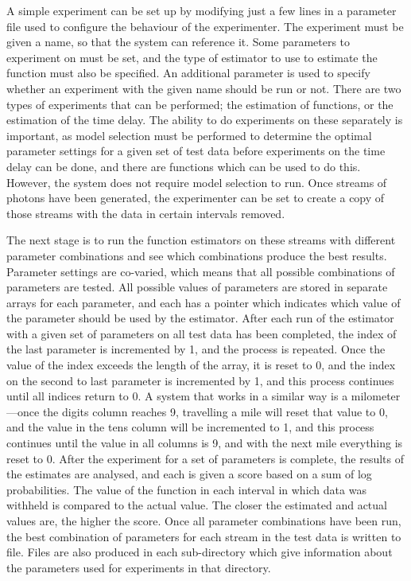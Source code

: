 \documentclass[a4paper,11pt]{article}
\begin{document}
   A simple experiment can be set up by modifying just a few lines in a
   parameter file used to configure the behaviour of the experimenter. The
   experiment must be given a name, so that the system can reference it. Some
   parameters to experiment on must be set, and the type of estimator to use to
   estimate the function must also be specified. An additional parameter is used
   to specify whether an experiment with the given name should be run or
   not. There are two types of experiments that can be performed; the estimation
   of functions, or the estimation of the time delay. The ability to do
   experiments on these separately is important, as model selection must be
   performed to determine the optimal parameter settings for a given set of test
   data before experiments on the time delay can be done, and there are
   functions which can be used to do this. However, the system does not require
   model selection to run. Once streams of photons have been generated, the
   experimenter can be set to create a copy of those streams with the data in
   certain intervals removed. 
   
   The next stage is to run the function estimators on these streams with
   different parameter combinations and see which combinations produce the best
   results. Parameter settings are co-varied, which means that all possible
   combinations of parameters are tested. All possible values of parameters are
   stored in separate arrays for each parameter, and each has a pointer which
   indicates which value of the parameter should be used by the estimator. After
   each run of the estimator with a given set of parameters on all test data has
   been completed, the index of the last parameter is incremented by 1, and the
   process is repeated. Once the value of the index exceeds the length of the
   array, it is reset to 0, and the index on the second to last parameter is
   incremented by 1, and this process continues until all indices return to 0. A
   system that works in a similar way is a milometer---once the digits column
   reaches 9, travelling a mile will reset that value to 0, and the value in the
   tens column will be incremented to 1, and this process continues until the
   value in all columns is 9, and with the next mile everything is reset
   to 0. After the experiment for a set of parameters is complete, the results
   of the estimates are analysed, and each is given a score based on a sum of
   log probabilities. The value of the function in each interval in which data
   was withheld is compared to the actual value. The closer the estimated and
   actual values are, the higher the score. Once all parameter combinations have
   been run, the best combination of parameters for each stream in the test data
   is written to file. Files are also produced in each sub-directory which give
   information about the parameters used for experiments in that directory. 
\end{document}

